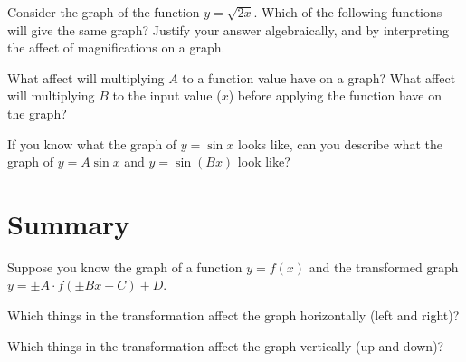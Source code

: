 \documentclass[number]{ximera}
\begin{document}
\begin{question}
Consider the graph of the function $y=\sqrt{2x}$. Which of the following functions will give the same graph? Justify your answer algebraically, and by interpreting the affect of magnifications on a graph.
\begin{multipleChoice}
\end{multipleChoice}
\end{question}


\begin{question}
What affect will multiplying $A$ to a function value have on a graph? What affect will multiplying $B$ to the input value ($x$) before applying the function have on the graph?
\begin{freeResponse}\end{freeResponse}
\end{question}

\begin{question}
If you know what the graph of $y = \sin x$ looks like, can you describe what the graph of $y = A \sin x$ and $y = \sin (Bx)$ look like?
\begin{freeResponse}\end{freeResponse}
\end{question}

\section{Summary}

Suppose you know the graph of a function $y = f(x)$ and the transformed graph $y = \pm A \cdot f(\pm Bx + C) +D$.

\begin{question}
Which things in the transformation affect the graph horizontally (left and right)?
\begin{selectAll}
\end{selectAll}
\end{question}

\begin{question}
Which things in the transformation affect the graph vertically (up and down)?
\begin{selectAll}
\end{selectAll}
\end{question}
\end{document}
